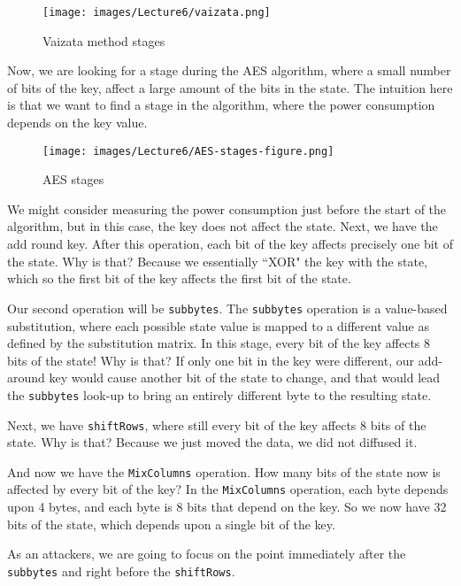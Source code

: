 \begin{figure}[!ht]
    \centering
    \texttt{[image: images/Lecture6/vaizata.png]}
    \caption{Vaizata method stages} \label{fig:vaizata}
\end{figure}

Now, we are looking for a stage during the AES algorithm, where a small number of bits of the key, affect a large amount of the bits in the state. 
The intuition here is that we want to find a stage in the algorithm, where the power consumption depends on the key value.

\begin{figure}[!ht]
    \centering
    \texttt{[image: images/Lecture6/AES-stages-figure.png]}
    \caption{AES stages} \label{fig:aes-stages}
\end{figure}

We might consider measuring the power consumption just before the start of the algorithm, but in this case, the key does not affect the state.
Next, we have the add round key. 
After this operation, each bit of the key affects precisely one bit of the state.
Why is that? 
Because we essentially ``XOR" the key with the state, which so the first bit of the key affects the first bit of the state.

Our second operation will be \texttt{subbytes}. 
The \texttt{subbytes} operation is a value-based substitution, where each possible state value is mapped to a different value as defined by the substitution matrix. 
In this stage, every bit of the key affects 8 bits of the state! Why is that? 
If only one bit in the key were different, our add-around key would cause another bit of the state to change, and that would lead the \texttt{subbytes} look-up to bring an entirely different byte to the resulting state.

Next, we have \texttt{shiftRows}, where still every bit of the key affects 8 bits of the state. 
Why is that? 
Because we just moved the data, we did not diffused it.

And now we have the \texttt{MixColumns} operation. 
How many bits of the state now is affected by every bit of the key? 
In the \texttt{MixColumns} operation, each byte depends upon 4 bytes, and each byte is 8 bits that depend on the key. 
So we now have 32 bits of the state, which depends upon a single bit of the key.

As an attackers, we are going to focus on the point immediately after the \texttt{subbytes} and right before the \texttt{shiftRows}. 

